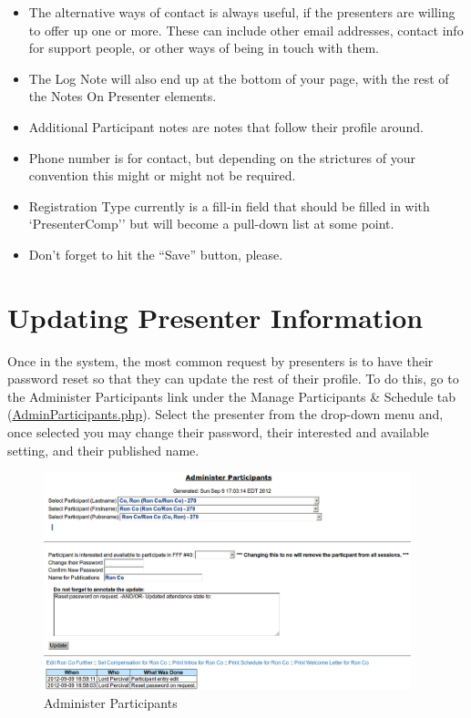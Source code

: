 \documentclass[tablesignature]{scrartcl}
\begin{document}
\begin{itemize}
\item The alternative ways of contact is always useful, if the
     presenters are willing to offer up one or more.  These can
     include other email addresses, contact info for support people,
     or other ways of being in touch with them.
\item The Log Note will also end up at the bottom of your page, with
     the rest of the Notes On Presenter elements.
\item Additional Participant notes are notes that follow their profile
     around.
\item Phone number is for contact, but depending on the strictures of
     your convention this might or might not be required.
\item Registration Type currently is a fill-in field that should be
     filled in with `PresenterComp'' but will become a pull-down list
     at some point.
\item Don't forget to hit the ``Save'' button, please.
\end{itemize}
\section{Updating Presenter Information}
\label{sec-3}

  
  Once in the system, the most common request by presenters is to have
  their password reset so that they can update the rest of their
  profile.  To do this, go to the Administer Participants link under
  the Manage Participants \& Schedule tab (\hyperref[AdminParticipants.php]{AdminParticipants.php}).
  Select the presenter from the drop-down menu and, once selected you
  may change their password, their interested and available setting,
  and their published name.

\begin{figure}[H]
\centering
\includegraphics[width=0.95\textwidth]{./Images/Administer_Participants.png}
\caption{\label{fig:Zambia_Presenter_Flow_Administer_Participants}Administer Participants}
\end{figure}
\end{document}
